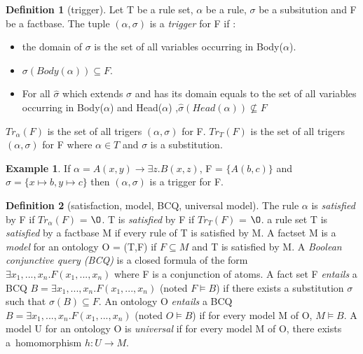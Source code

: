 \documentclass{article}
\theoremstyle{proposal}
\theoremstyle{definition}
\newtheorem{definition}{Definition}[section]
\theoremstyle{theorem}
\theoremstyle{example}
\newtheorem{example}{Example}[section]
\theoremstyle{remark}
\begin{document}
\begin{definition}[trigger]
Let T be a rule set, $\alpha$ be a rule, $\sigma$ be a subsitution and F be a factbase. The tuple $(\alpha,\sigma)$ is a \emph{trigger} for F if : 
\begin{itemize}
\item the domain of $\sigma$ is the set of all variables occurring in Body($\alpha$).
\item $\sigma(Body(\alpha)) \subseteq F$.
\item For all $\hat \sigma$ which extends $\sigma$ and has its domain equals to the set of all variables occurring in Body($\alpha$) and Head($\alpha$) ,$\hat \sigma(Head(\alpha)) \nsubseteq F$
\end{itemize}
\emph{$Tr_{\alpha}(F)$} is the set of all trigers $(\alpha,\sigma)$ for F. \emph{$Tr_{T}(F)$} is the set of all trigers $(\alpha,\sigma)$ for F where $\alpha \in T$ and $\sigma$ is a substitution. 
\end{definition}

\begin{example}If $\alpha = A(x,y) \rightarrow \exists z.B(x,z)$, F = $\{A(b,c)\}$ and $\sigma = \{x \mapsto b, y \mapsto c \}$ then $(\alpha,\sigma)$ is a trigger for F.
\end{example}

\begin{definition}[satisfaction, model, BCQ, universal model]
The rule $\alpha$ is \emph{satisfied} by F if $Tr_{\alpha}(F)$ = $\O$. T is \emph{satisfied} by F if $Tr_{T}(F)$ = $\O$.
a rule set T is \emph{satisfied} by a factbase M if every rule of T is satisfied by M. A factset M is a \emph{model} for an ontology O = (T,F) if $F \subseteq M$ and T is satisfied by M. A \emph{Boolean conjunctive query (BCQ)} is a closed formula of the form \\ $\exists x_1,...,x_n. F(x_1,...,x_n)$ where F is a conjunction of atoms. A fact set F \emph{entails} a BCQ $B = \exists x_1,...,x_n.F(x_1,...,x_n)$ (noted $F \vDash B$) if there exists a substitution $\sigma$ such that $\sigma(B) \subseteq F$. An ontology O \emph{entails} a BCQ $B = \exists x_1,...,x_n.F(x_1,...,x_n)$ (noted $O \vDash B$) if for every model M of O, $M \vDash B$. A model U for an ontology O is \emph{universal} if for
every model M of O, there exists a\ homomorphism $h : U \to M$.
\end{definition}
\end{document}
